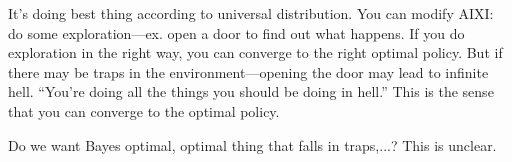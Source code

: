 \documentclass[11pt]{article}
\begin{document}
It's doing best thing according to universal distribution. You can modify AIXI: do some exploration---ex. open a door to find out what happens. If you do exploration in the right way, you can converge to the right optimal policy. %
But if there may be traps in the environment---opening the door may lead to infinite hell. ``You're doing all the things you should be doing in hell.'' This is the sense that you can converge to the optimal policy.

Do we want Bayes optimal, optimal thing that falls in traps,...? This is unclear.







\end{document}
